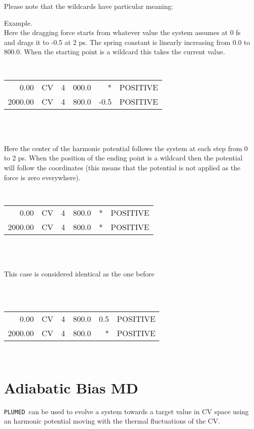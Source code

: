 \documentclass[12pt,fleqn]{report}
\newcommand{\plumed}{{\tt PLUMED}}
\newcommand{\esempio}[1]{
\vspace{10pt}
\begin{flushright}
\colorbox{light-gray}{
   \begin{minipage}{13cm}
       \scriptsize{
{\fontfamily{phv} \fontseries{b}
 \selectfont Example. \\
 \fontseries{m} \selectfont #1 } }
\end{minipage}}
\end{flushright}
\vspace{20pt}
}
\begin{document}
Please note that the wildcards have particular meaning:
\esempio{Here the dragging force starts from whatever value the system assumes at 0 fs 
and drags it to -0.5 at 2 ps. The spring constant is linearly increasing from 0.0 to 800.0. 
When the starting point is a wildcard this takes the current value. 
 \vspace{10pt}\\
{\tt
\begin{tabular} {r  r r r r r  }
      0.00 & CV &  4 &  000.0 &   *    &   POSITIVE    \\
   2000.00 & CV &  4 &  800.0 &  -0.5  &   POSITIVE    \\
\end{tabular}\\
}
 \vspace{10pt}\\
Here the center of the harmonic potential follows the system at each step from 0 to 2 ps. 
When the position of the ending point is a wildcard then the potential will 
follow the coordinates (this means that the potential is not applied as the force is zero everywhere). 
 \vspace{10pt}\\
{\tt
\begin{tabular} {r  r r r r r }
      0.00 & CV &  4 &  800.0 &   *    &   POSITIVE    \\
   2000.00 & CV &  4 &  800.0 &   *    &   POSITIVE    \\
\end{tabular}\\
}
 \vspace{10pt}\\
This case is considered identical as the one before \\
 \vspace{10pt}\\
{\tt
\begin{tabular} {r  r r r r r  }
      0.00 & CV &  4 &  800.0 &   0.5  &   POSITIVE    \\
   2000.00 & CV &  4 &  800.0 &   *    &   POSITIVE    \\
\end{tabular}\\
}
}


\section{Adiabatic Bias MD}
\plumed \ can be used to evolve a system towards a target value in
CV space using an harmonic potential moving with the thermal fluctuations of the CV\cite{ballone,provasi10abmd,camilloni11abmd}.
\end{document}
